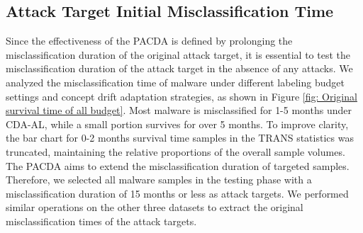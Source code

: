\documentclass[conference,compsoc]{IEEEtran} %
\begin{document}
\begin{itemize}[leftmargin=*]
\end{itemize}



\subsection{Attack Target Initial Misclassification Time}
\label{Sec: Attack Target Initial Survival Time (APIGraph)}
Since the effectiveness of the PACDA is defined by prolonging the misclassification duration of the original attack target, it is essential to test the misclassification duration of the attack target in the absence of any attacks.
We analyzed the misclassification time of malware under different labeling budget settings and concept drift adaptation strategies, as shown in Figure \ref{fig: Original survival time of all budget}.
Most malware is misclassified for 1-5 months under CDA-AL, while a small portion survives for over 5 months.
To improve clarity, the bar chart for 0-2 months survival time samples in the TRANS statistics was truncated, maintaining the relative proportions of the overall sample volumes.
The PACDA aims to extend the misclassification duration of targeted samples. 
Therefore, we selected all malware samples in the testing phase with a misclassification duration of 15 months or less as attack targets.
We performed similar operations on the other three datasets to extract the original misclassification times of the attack targets.
\end{document}
